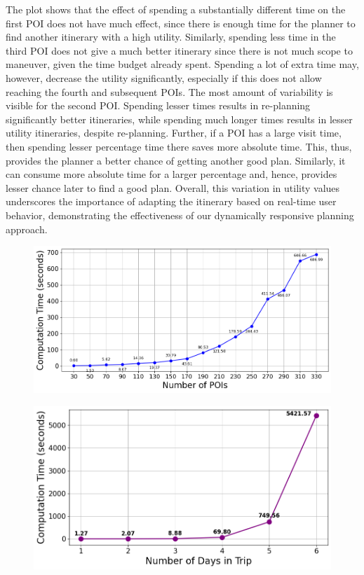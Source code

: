 The plot shows that the effect of spending a substantially different time on the first POI does not have much effect, since there is enough time for the planner to find another itinerary with a high utility.
Similarly, spending less time in the third POI does not give a much better itinerary since there is not much scope to maneuver, given the time budget already spent. Spending a lot of extra time may, however, decrease the utility significantly, especially if this does not allow reaching the fourth and subsequent POIs.
The most amount of variability is visible for the second POI.
Spending lesser times results in re-planning significantly better itineraries, while spending much longer times results in lesser utility itineraries, despite re-planning.
Further, if a POI has a large visit time, then spending lesser percentage time there
saves more absolute time. This, thus, provides the planner a better chance of getting another good plan. Similarly, it can consume more absolute time for a larger percentage and, hence, provides lesser chance later to find a good plan.
Overall, this variation in utility values underscores the importance of adapting the itinerary based on real-time user behavior, demonstrating the effectiveness of our dynamically responsive planning approach.

\begin{figure}[t]
    \centering
    \includegraphics[width=\figwidth]{plots/scalability_new_pkj.png}
    \label{fig:number-of-pois}
\end{figure}

\begin{figure}[t]
    \centering
\includegraphics[width=\figwidth]{plots/scalability_multiday.png}
    \label{fig:number-of-days}
\end{figure}


